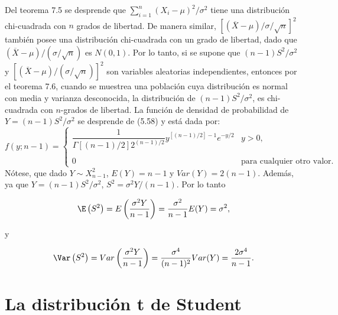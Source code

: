 Del teorema 7.5 se desprende que $\sum_{i=1}^n (X_i-\mu)^2/\sigma^2$ tiene una distribución chi-cuadrada con $n$ grados de libertad. De manera similar, $\left[(\overline{X}-\mu)/\sigma/\sqrt{n}\right]^2$ también posee una distribución chi-cuadrada con un grado de libertad, dado que $(\overline{X}-\mu)/(\sigma/\sqrt{n})$ es $N(0,1)$. Por lo tanto, si se supone que $(n-1)S^2/\sigma^2$ y $\left[(\overline{X}-\mu)/(\sigma/\sqrt{n})\right]^2$ son variables aleatorias independientes, entonces por el teorema 7.6, cuando se muestrea una población cuya distribución es normal con media y varianza desconocida, la distribución de $(n-1)S^2/\sigma^2$, es chi-cuadrada con $n$-grados de libertad. La función de densidad de probabilidad de $Y=(n-1)S^2/\sigma^2$ se desprende de (5.58) y está dada por:
$$
f(y;n-1)=
\left\{
    \begin{array}{lc}
	\dfrac{1}{\Gamma\left[(n-1)/2\right]2^{(n-1)/2}}y^{\left[(n-1)/2\right]-1}e^{-y/2} & y>0,\\\\
	0&\mbox{para cualquier otro valor.}
    \end{array}
\right.
$$
Nótese, que dado $Y\sim X_{n-1}^2$, $E(Y)=n-1$ y $Var(Y)=2(n-1)$. Además, ya que $Y=(n-1)S^2/\sigma^2$, $S^2=\sigma^2Y/(n-1)$. Por lo tanto
\begin{tcolorbox}
    $$\E\left(S^2\right)=E\left(\dfrac{\sigma^2 Y}{n-1}\right)=\dfrac{\sigma^2}{n-1}E(Y)=\sigma^2,$$
\end{tcolorbox}

y 

\begin{tcolorbox}
    $$\Var\left(S^2\right)=Var\left(\dfrac{\sigma^2Y}{n-1}\right)=\dfrac{\sigma^4}{(n-1)^2}Var(Y)=\dfrac{2\sigma^4}{n-1}.$$
\end{tcolorbox}


\section{La distribución t de Student}
